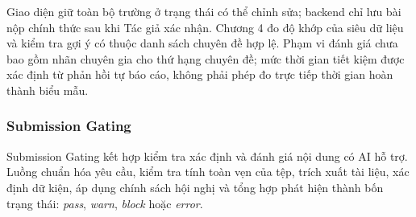 Giao diện giữ toàn bộ trường ở trạng thái có thể chỉnh sửa; backend chỉ lưu bài nộp chính thức sau khi Tác giả xác nhận. Chương 4 đo độ khớp của siêu dữ liệu và kiểm tra gợi ý có thuộc danh sách chuyên đề hợp lệ. Phạm vi đánh giá chưa bao gồm nhãn chuyên gia cho thứ hạng chuyên đề; mức thời gian tiết kiệm được xác định từ phản hồi tự báo cáo, không phải phép đo trực tiếp thời gian hoàn thành biểu mẫu.

\subsubsection{Submission Gating}

Submission Gating kết hợp kiểm tra xác định và đánh giá nội dung có AI hỗ trợ. Luồng chuẩn hóa yêu cầu, kiểm tra tính toàn vẹn của tệp, trích xuất tài liệu, xác định dữ kiện, áp dụng chính sách hội nghị và tổng hợp phát hiện thành bốn trạng thái: \textit{pass}, \textit{warn}, \textit{block} hoặc \textit{error}.

